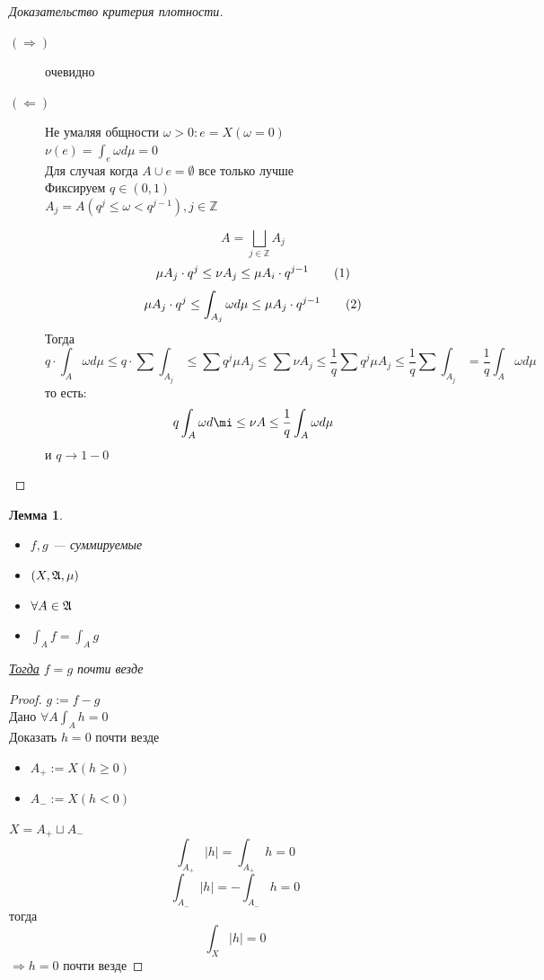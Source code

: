 \documentclass[oneside]{book}
\newcommand\addtag{\refstepcounter{equation}\tag{\theequation}}
\theoremstyle{plain}
\newtheorem{lemma}{Лемма}
\theoremstyle{remark}
\theoremstyle{definition}
\begin{document}
\begin{proof}[Доказательство критерия плотности]
\begin{description}
\item[{\((\Rightarrow)\)}] очевидно
\item[{\((\Leftarrow)\)}] Не умаляя общности \(\omega > 0: e = X(\omega = 0)\) \\
\(\nu(e) = \int_e \omega d\mu = 0\) \\
Для случая когда \(A \cup e = \emptyset\) все только лучше \\
Фиксируем \(q \in (0, 1)\) \\
\(A_j = A(q^j \le \omega < q^{j - 1}), j \in \mathbb{Z}\) \\
\begin{center}
\end{center}
\[ A = \bigsqcup_{j \in \mathbb{Z}} A_j \]
\[ \mu A_j \cdot q^{j} \le \nu A_j \le \mu A_i \cdot q^{j - 1} \addtag\label{5_1_neq}\]
\[ \mu A_j \cdot q^j \le \int_{A_j} \omega d\mu \le \mu A_j \cdot q^{j - 1} \addtag\label{5_2_neq} \]
Тогда
\[ q \cdot \int_A \omega d\mu \le q \cdot \sum \int_{A_j} \le \sum q^j \mu A_j \le \sum \nu A_j \le \frac{1}{q} \sum q^j \mu A_j \le \frac{1}{q} \sum \int_{A_j} = \frac{1}{q} \int_A \omega d\mu \ \]
то есть:
\[ q \int_A \omega d\mi \le \nu A \le \frac{1}{q} \int_A \omega d\mu \]
и \(q \to 1 - 0\)
\end{description}
\end{proof}
\begin{lemma}
\-
\begin{itemize}
\item \(f, g\) --- суммируемые
\item \((X, \mathfrak{A}, \mu)\)
\item \(\forall A \in \mathfrak{A}\)
\item \(\int_A f = \int_A g\)
\end{itemize}
\uline{Тогда} \(f = g\) почти везде
\end{lemma}
\begin{proof}
\(g := f - g\) \\
Дано \(\forall A \int_A h = 0\) \\
Доказать \(h = 0\) почти везде \\
\begin{itemize}
\item \(A_{+} := X(h \ge 0)\)
\item \(A_{-} := X(h < 0)\)
\end{itemize}
\(X = A_+ \sqcup A_-\)
\[ \int_{A_+} |h| = \int_{A_+} h = 0 \]
\[ \int_{A_-} |h| = -\int_{A_-} h = 0 \]
тогда \[ \int_X |h| = 0 \]
\(\Rightarrow h = 0\) почти везде
\end{proof}
\end{document}
